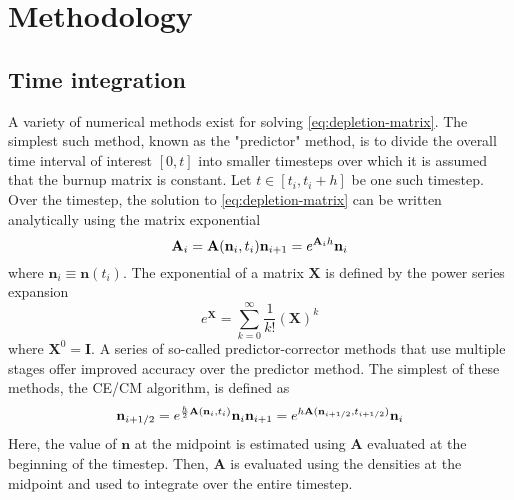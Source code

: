 \documentclass[3p,authoryear]{elsarticle}
\begin{document}
\section{Methodology}
\label{sec:methods}

\subsection{Time integration}
\label{sec:time_integration}

A variety of numerical methods exist for solving \cref{eq:depletion-matrix}. The
simplest such method, known as the "predictor" method, is to divide the overall
time interval of interest $[0,t]$ into smaller timesteps over which it is
assumed that the burnup matrix is constant. Let $t \in [t_i, t_i + h]$ be one
such timestep. Over the timestep, the solution to \cref{eq:depletion-matrix} can
be written analytically using the matrix exponential
\begin{equation}
    \mathbf{A}_i = \mathbf{A}(\mathbf{n}_i, t_i) \\
    \mathbf{n}_{i+1} = e^{\mathbf{A}_i h} \mathbf{n}_i
\end{equation}
where $\mathbf{n}_i \equiv \mathbf{n}(t_i)$. The exponential of a matrix
$\mathbf{X}$ is defined by the power series expansion
\begin{equation}
    e^{\mathbf{X}} = \sum\limits_{k=0}^\infty \frac{1}{k!} \left ( \mathbf{X}
    \right )^k
\end{equation}
where $\mathbf{X}^0 = \mathbf{I}$. A series of so-called predictor-corrector
methods that use multiple stages offer improved accuracy over the predictor
method. The simplest of these methods, the CE/CM algorithm, is defined as
\begin{equation}
    \mathbf{n}_{i+1/2} = e^{\frac{h}{2}\mathbf{A}(\mathbf{n}_i, t_i)} \mathbf{n}_i \\
    \mathbf{n}_{i+1} = e^{h \mathbf{A}(\mathbf{n}_{i+1/2},t_{i+1/2})} \mathbf{n}_i
\end{equation}
Here, the value of $\mathbf{n}$ at the midpoint is estimated using
$\mathbf{A}$ evaluated at the beginning of the timestep. Then,
$\mathbf{A}$ is evaluated using the densities at the midpoint and used to
integrate over the entire timestep.
\end{document}
